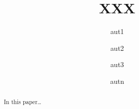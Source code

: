 \documentclass{article}
\title{\linbox XXX}
\author{aut1 \and aut2 \and aut3 \and autn}
\date{}
\begin{document}
\maketitle

\begin{abstract}
\large \danger In this paper\dots
\end{abstract}

%

%
%
%

%
%
%
%


%

%
%
%
%


%
%
\end{document}
